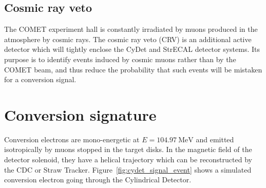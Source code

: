 \subsection{Cosmic ray veto}\label{sec:crv}
The COMET experiment hall is constantly irradiated by muons produced in the
atmosphere by cosmic rays. The cosmic ray veto (CRV) is an additional active
detector which will tightly enclose the CyDet and StrECAL detector systems. Its
purpose is to identify events induced by cosmic muons rather than by the COMET
beam, and thus reduce the probability that such events will be mistaken for a
conversion signal.

\section{Conversion signature}
Conversion electrons are mono-energetic at $E=\SI{104.97}{\MeV}$ and emitted
isotropically by muons stopped in the target disks. In the magnetic field of the
detector solenoid, they have a helical trajectory which can be reconstructed by
the CDC or Straw Tracker. Figure~\ref{fig:cydet_signal_event} shows a simulated
conversion electron going through the Cylindrical Detector.



